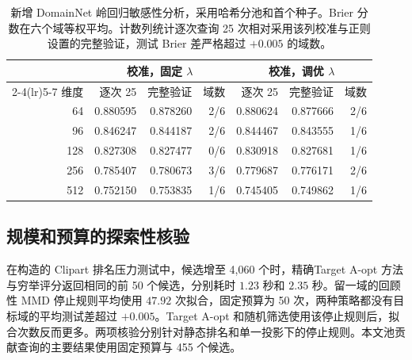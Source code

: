 \documentclass[UTF8,fontset=fandol,scheme=chinese,zihao=false,11pt,letterpaper]{ctexart}
\begin{document}
\begin{table}[htbp]
\centering
\caption{新增 DomainNet 岭回归敏感性分析，采用哈希分池和首个种子。Brier 分数在六个域等权平均。计数列统计逐次查询 25 次相对采用该列校准与正则设置的完整验证，测试 Brier 差严格超过 $+0.005$ 的域数。}
\label{tab:fresh-ridge-sensitivity}
\begin{tabular}{r rrr rrr}
\toprule
 & \multicolumn{3}{c}{校准，固定 $\lambda$} & \multicolumn{3}{c}{校准，调优 $\lambda$} \\
\cmidrule(lr){2-4}\cmidrule(lr){5-7}
维度 & 逐次 25 & 完整验证 & 域数 & 逐次 25 & 完整验证 & 域数 \\
\midrule
64  & 0.880595 & 0.878260 & 2/6 & 0.880624 & 0.877666 & 2/6 \\
96  & 0.846247 & 0.844187 & 2/6 & 0.844467 & 0.843555 & 1/6 \\
128 & 0.827308 & 0.827477 & 0/6 & 0.830918 & 0.827681 & 1/6 \\
256 & 0.785407 & 0.780673 & 3/6 & 0.779687 & 0.776171 & 2/6 \\
512 & 0.752150 & 0.753835 & 1/6 & 0.745405 & 0.749862 & 1/6 \\
\bottomrule
\end{tabular}
\end{table}

\subsection{规模和预算的探索性核验}
在构造的 Clipart 排名压力测试中，候选增至 4,060 个时，精确Target A-opt 方法与穷举评分返回相同的前 50 个候选，分别耗时 $1.23$ 秒和 $2.35$ 秒。留一域的回顾性 MMD 停止规则平均使用 $47.92$ 次拟合，固定预算为 50 次，两种策略都没有目标域的平均测试差超过 $+0.005$。Target A-opt 和随机筛选使用该停止规则后，拟合次数反而更多。两项核验分别针对静态排名和单一投影下的停止规则。本文池贡献查询的主要结果使用固定预算与 455 个候选。
\end{document}
